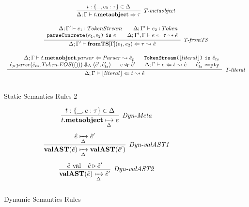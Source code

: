 \begin{figure}
\[\begin{array}{c}
\infer[\textit{T-metaobject}]
        {\Delta; \Gamma \vdash t.\keyw{metaobject} \Rightarrow \tau   }
	{t:\{\_, e_0:\tau\} \in \Delta} \\[3ex]


\infer[\textit{T-fromTS}]
	  {\Delta; \Gamma' \vdash \keyw{fromTS}[\Gamma](e_1,e_2) \Leftarrow \tau \leadsto \hat{e} }
	  {\renewcommand{\arraystretch}{1}
	    \begin{array}{r}
	    \Delta;\Gamma' \vdash e_1:TokenStream ~~~~~~ \Delta;\Gamma' \vdash e_2:Token\\
            \texttt{parseConcrete(}e_1,e_2\texttt{)}\ \texttt{is}\ e ~~~~~~\Delta; \Gamma', \Gamma \vdash e \Leftarrow \tau \leadsto \hat{e}
            \end{array}
       } \\[3ex]  

\infer[\textit{T-literal}]
	  {\Delta; \Gamma \vdash \lfloor literal \rfloor \Leftarrow t \leadsto \hat{e} }
	  {\renewcommand{\arraystretch}{1}
	    \begin{array}{r}
	    \Delta;\Gamma \vdash t.\keyw{metaobject}.parser\Leftarrow Parser \leadsto \hat{e}_p ~~~~~ \texttt{TokenStream(}\lfloor literal \rfloor \texttt{)}\ \texttt{is}\ \hat{e}_{ts}\\
            \hat{e}_p.parse(\hat{e}_{ts}, Token.EOS(())) \Downarrow_{\Delta} (\hat{e}', \hat e_{ts}') ~~~~~  e \triangleleft_\Gamma \hat{e}'~~~~~ \Delta;\Gamma\vdash e\Leftarrow t \leadsto \hat{e} ~~~~~ \hat e_{ts}'\ \texttt{empty}
            \end{array}
       } \\[3ex]   
\end{array}
\]
\caption{Static Semantics Rules 2}
\end{figure}

\begin{figure}
\centering
\[
\begin{array}{c}

\infer[\textit{Dyn-Meta}]
	{t.\keyw{metaobject} \xmapsto[\Delta]{} e} 
	{t:\{\_,e:\tau \} \in \Delta}\\[3ex]

\infer[\textit{Dyn-valAST1}]
	{\keyw{valAST}(\hat{e}) \xmapsto[\Delta]{} \keyw{valAST}(\hat{e}') } 
	{\hat{e} \xmapsto[\Delta]{} \hat{e}'}\\[3ex]

\infer[\textit{Dyn-valAST2}]
	{\keyw{valAST}(\hat{e}) \xmapsto[\Delta]{} \hat{e}' } 
	{\hat{e}\ \text{val} &\hat{e} \triangleright \hat{e}' }\\[3ex]




\end{array}
\]
\caption{Dynamic Semantics Rules}
\end{figure}




